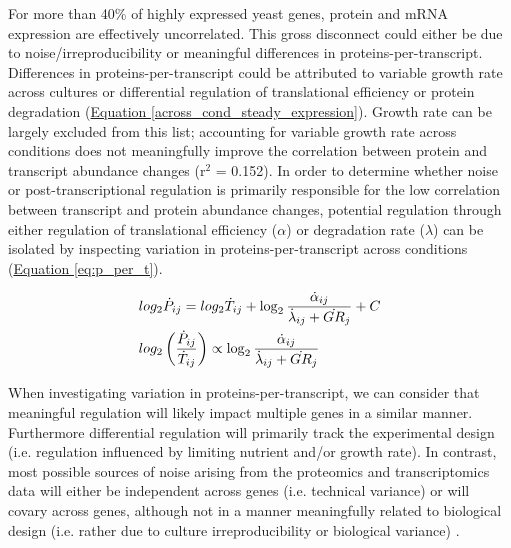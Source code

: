 For more than 40\% of highly expressed yeast genes, protein and mRNA expression are effectively uncorrelated.  This gross disconnect could either be due to noise/irreproducibility or meaningful differences in proteins-per-transcript. Differences in proteins-per-transcript could be attributed to variable growth rate across cultures or differential regulation of translational efficiency or protein degradation (\hyperref[across_cond_steady_expression]{Equation \ref{across_cond_steady_expression}}).  Growth rate can be largely excluded from this list; accounting for variable growth rate across conditions does not meaningfully improve the correlation between protein and transcript abundance changes (r$^{2}$ = 0.152).  In order to determine whether noise or post-transcriptional regulation is primarily responsible for the low correlation between transcript and protein abundance changes, potential regulation through either regulation of translational efficiency ($\alpha$) or degradation rate ($\lambda$) can be isolated by inspecting variation in proteins-per-transcript across conditions (\hyperref[eq:p_per_t]{Equation \ref{eq:p_per_t}}).

\begin{align}
&log_{2}\dot{P}_{ij} = log_{2}\dot{T}_{ij} + \log_{2}\frac{\dot{\alpha}_{ij}}{\dot{\lambda}_{ij} + \dot{GR}_{j}} + C\notag\\
&log_{2}\left(\frac{\dot{P}_{ij}}{\dot{T}_{ij}}\right) \propto \log_{2}\frac{\dot{\alpha}_{ij}}{\dot{\lambda}_{ij} + \dot{GR}_{j}}\notag\\
\label{eq:p_per_t}
\end{align}

When investigating variation in proteins-per-transcript, we can consider that meaningful regulation will likely impact multiple genes in a similar manner.  Furthermore differential regulation will primarily track the experimental design (i.e. regulation influenced by limiting nutrient and/or growth rate).  In contrast, most possible sources of noise arising from the proteomics and transcriptomics data will either be independent across genes (i.e. technical variance) or will covary across genes, although not in a manner meaningfully related to biological design (i.e. rather due to culture irreproducibility or biological variance) \cite{Leek:2007kn}.

